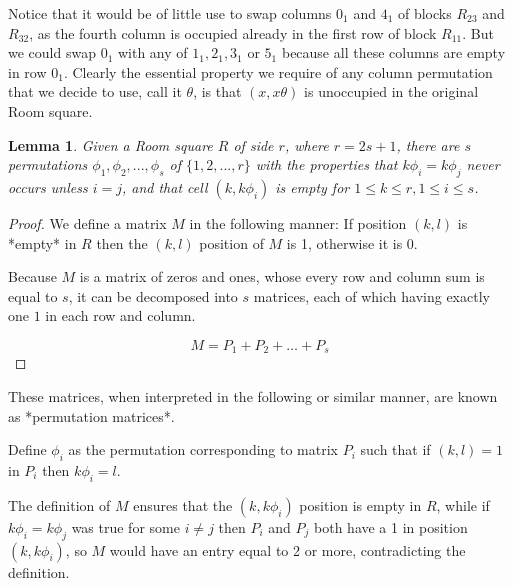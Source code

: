 \documentclass[
  11pt,
  a4paper]{book}\usepackage[]{graphicx}\usepackage[]{xcolor}
\newtheorem{lemma}[theorem]{Lemma}
\begin{document}
Notice that it would be of little use to swap columns $0_1$
and $4_1$ of blocks $R_{23}$ and $R_{32}$, as the fourth
column is occupied already in the first row of block
$R_{11}$. But we could swap $0_1$ with any of $1_1,2_1,3_1$
or $5_1$ because all these columns are empty in row $0_1$.
Clearly the essential property we require of any column
permutation that we decide to use, call it $\theta$, is that
$(x,x\theta)$ is unoccupied in the original Room square.

\begin{lemma}
\label{lem:permute}
Given a Room square $R$ of side $r$, where $r=2s+1$, there
are $s$ permutations $\phi_1,\phi_2,...,\phi_s$ of
$\{1,2,...,r\}$ with the properties that $k\phi_i=k\phi_j$
never occurs unless $i=j$, and that cell $(k,k\phi_i)$ is
empty for $1 \leq k \leq r, 1 \leq i\leq s$.
\end{lemma}

\begin{proof}
We define a matrix $M$ in the following manner: If position
$(k,l)$ is *empty* in $R$ then the $(k,l)$ position of $M$
is 1, otherwise it is 0.

Because $M$ is a matrix of zeros and ones, whose every row and
column sum is equal to $s$, it can be decomposed into $s$
matrices, each of which having exactly one $1$ in each row
and column.

\begin{equation}
M = P_1 + P_2 + \ldots + P_s
\end{equation}
\end{proof}

These matrices, when interpreted in the following or similar
manner, are known as *permutation matrices*.

Define $\phi_i$ as the permutation corresponding to matrix
$P_i$ such that if $(k,l) = 1$ in $P_i$ then $k\phi _i = l$.

The definition of $M$ ensures that the $(k, k\phi _i)$
position is empty in $R$, while if $k\phi_{i} = k\phi_{j}$
was true for some $i \neq j$ then $P_i$ and $P_j$ both have
a 1 in position $(k, k\phi_i)$, so $M$ would have an entry
equal to 2 or more, contradicting the definition.
\end{document}
